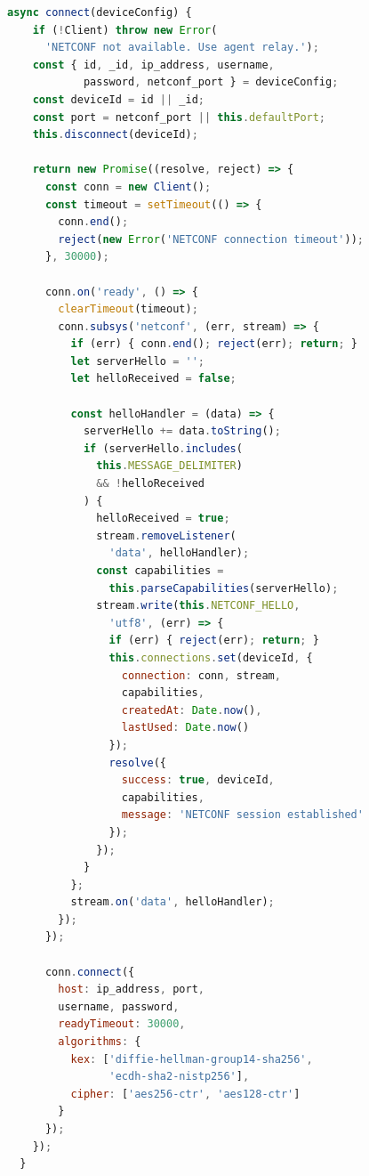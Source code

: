 \begin{lstlisting}[language=JavaScript, caption={netconfService.js -- connect}]
  async connect(deviceConfig) {
    if (!Client) throw new Error(
      'NETCONF not available. Use agent relay.');
    const { id, _id, ip_address, username,
            password, netconf_port } = deviceConfig;
    const deviceId = id || _id;
    const port = netconf_port || this.defaultPort;
    this.disconnect(deviceId);

    return new Promise((resolve, reject) => {
      const conn = new Client();
      const timeout = setTimeout(() => {
        conn.end();
        reject(new Error('NETCONF connection timeout'));
      }, 30000);

      conn.on('ready', () => {
        clearTimeout(timeout);
        conn.subsys('netconf', (err, stream) => {
          if (err) { conn.end(); reject(err); return; }
          let serverHello = '';
          let helloReceived = false;

          const helloHandler = (data) => {
            serverHello += data.toString();
            if (serverHello.includes(
              this.MESSAGE_DELIMITER)
              && !helloReceived
            ) {
              helloReceived = true;
              stream.removeListener(
                'data', helloHandler);
              const capabilities =
                this.parseCapabilities(serverHello);
              stream.write(this.NETCONF_HELLO,
                'utf8', (err) => {
                if (err) { reject(err); return; }
                this.connections.set(deviceId, {
                  connection: conn, stream,
                  capabilities,
                  createdAt: Date.now(),
                  lastUsed: Date.now()
                });
                resolve({
                  success: true, deviceId,
                  capabilities,
                  message: 'NETCONF session established'
                });
              });
            }
          };
          stream.on('data', helloHandler);
        });
      });

      conn.connect({
        host: ip_address, port,
        username, password,
        readyTimeout: 30000,
        algorithms: {
          kex: ['diffie-hellman-group14-sha256',
                'ecdh-sha2-nistp256'],
          cipher: ['aes256-ctr', 'aes128-ctr']
        }
      });
    });
  }
\end{lstlisting}

